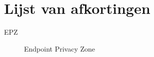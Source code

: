\chapter*{Lijst van afkortingen}
\begin{description}
    \item[EPZ] Endpoint Privacy Zone
\end{description}